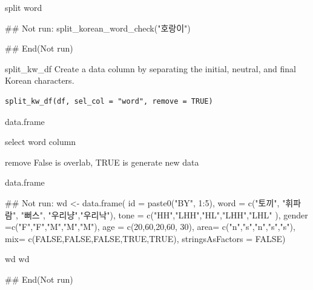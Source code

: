 \documentclass[a4paper]{book}
\begin{document}
%
\begin{Value}
split word
\end{Value}
%
\begin{Examples}
\begin{ExampleCode}
## Not run: 
split_korean_word_check("호랑이")

## End(Not run)

\end{ExampleCode}
\end{Examples}
%
\begin{Description}
split\_kw\_df Create a data column by separating the initial, neutral, and final Korean characters.
\end{Description}
%
\begin{Usage}
\begin{verbatim}
split_kw_df(df, sel_col = "word", remove = TRUE)
\end{verbatim}
\end{Usage}
%
\begin{Arguments}
\begin{ldescription}
\item[\code{df}] data.frame

\item[\code{sel\_col}] select word column

\item[\code{remove}] remove False is overlab, TRUE is generate new data
\end{ldescription}
\end{Arguments}
%
\begin{Value}
data.frame
\end{Value}
%
\begin{Examples}
\begin{ExampleCode}
## Not run: 
wd <- data.frame(
id =  paste0("BY", 1:5),
word = c("토끼", "휘파람", "뻐스", "우리냥","우리낙"),
tone = c("HH","LHH","HL","LHH","LHL" ),
gender =c("F","F","M","M","M"),
age = c(20,60,20,60, 30),
area= c("n","s","n","s","s"),
mix= c(FALSE,FALSE,FALSE,TRUE,TRUE),
stringsAsFactors = FALSE)

wd%
wd%


## End(Not run)

\end{ExampleCode}
\end{Examples}
\end{document}
